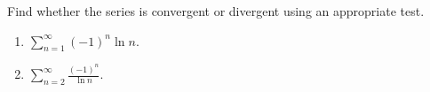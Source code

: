 Find whether the series is convergent or divergent using an
appropriate test.  
\begin{enumerate}[ref={\fcProblemRef}]
\item \label{problemConvergencesumn=1^infty(-1)^nlnn} $\displaystyle\sum_{n=1}^{\infty} (-1)^n\ln n  . $
\item \label{problemConvergencesumn=2^infty(-1)^n/lnn} $\displaystyle\sum_{n=2}^{\infty} \frac{(-1)^n }{\ln n}  .$
\end{enumerate}